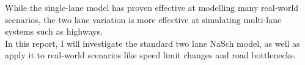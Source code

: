 \documentclass[11pt]{article}
\begin{document}
	While the single-lane model has proven effective at modelling many real-world scenarios, the two lane variation is more effective at simulating multi-lane systems such as highways.\\ 
	
	In this report, I will investigate the standard two lane NaSch model, as well as apply it to real-world scenarios like speed limit changes and road bottlenecks.
	
	
	\newpage
	
	
	
	
\end{document}
